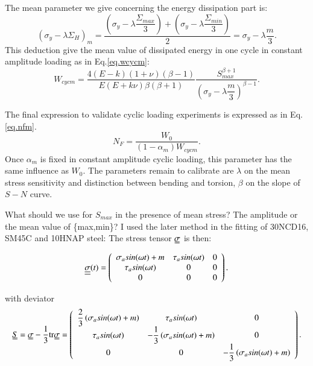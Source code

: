 \documentclass[3p,times,number,review]{elsarticle}
\begin{document}
The mean parameter we give concerning the energy dissipation part is:
$$\left(\sigma_y-\lambda \Sigma_H\right)_m=\dfrac{\left(\sigma_y-\lambda\dfrac{\Sigma_{max}}{3}\right)+\left(\sigma_y-\lambda \dfrac{\Sigma_{min}}{3}\right)}{2}=\sigma_y-\lambda \dfrac{m}{3}.$$
This deduction give the mean value of dissipated energy in one cycle in constant amplitude loading as in Eq.\eqref{eq.wcycm}:
\begin{equation}
W_{cycm}=\dfrac{4(E-k)(1+\nu)\left( \beta-1\right) }{ E(E+k\nu)\beta\left( \beta+1\right) }\dfrac{S_{max}^{\beta+1} }{\left(\sigma_y-\lambda \dfrac{m}{3}\right)^{\beta-1}}.
\label{eq.wcycm}
\end{equation}

The final expression to validate cyclic loading experiments is expressed as in Eq.\eqref{eq.nfm}.
\begin{equation}
N_F=\dfrac{W_0}{\left( 1-\alpha_m\right)W_{cycm} }.
\label{eq.nfm}
\end{equation}
Once $\alpha_m$ is fixed in constant amplitude cyclic loading, this parameter has the same influence as $W_0$. The parameters remain to calibrate are $\lambda$ on the mean stress sensitivity and distinction between bending and torsion, $\beta$ on the slope of $S-N$ curve.

What should we use for $S_{max}$ in the presence of mean stress? The amplitude or the mean value of \{max,min\}?
I used the later method in the fitting of 30NCD16, SM45C and 10HNAP steel:
The stress tensor $\uuline{\sigma}$ is then:
\begin{equation} 
\uline{\uline{\sigma}}(t)=
\left(
\begin{array}{ccc}
\sigma_{a}sin(\omega t)+m & \tau_asin(\omega t) & 0\\
\tau_asin(\omega t) & 0 & 0\\ 
0 & 0 & 0\\
\end{array}\right) .
\end{equation}

with deviator
\begin{equation} 
\uuline{S}=\uuline{\sigma}-\dfrac{1}{3}\textrm{tr}\uuline{\sigma}=
\left(
\begin{array}{ccc}
\dfrac{2}{3}\left( \sigma_{a}sin(\omega t)+m\right)  & \tau_asin(\omega t) & 0\\
\tau_asin(\omega t) & -\dfrac{1}{3}\left( \sigma_{a}sin(\omega t)+m\right)& 0\\ 
0 & 0 & -\dfrac{1}{3}\left( \sigma_{a}sin(\omega t)+m\right)\\
\end{array}\right) .
\end{equation}
\end{document}
